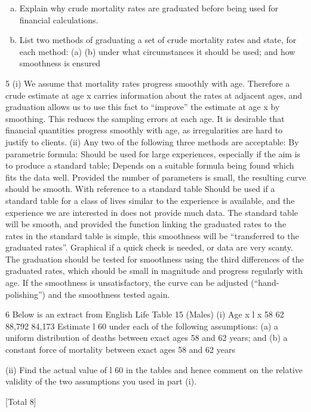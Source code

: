 \documentclass[a4paper,12pt]{article}
\begin{document}
\begin{enumerate}[(a)]
\item
Explain why crude mortality rates are graduated before being used for
financial calculations.
\item 
List two methods of graduating a set of crude mortality rates and state, for
each method:
(a)
(b)
under what circumstances it should be used; and
how smoothness is ensured
\end{enumerate}

\newpage

5
(i)
We assume that mortality rates progress smoothly with age.
Therefore a crude estimate at age x carries information about the rates at
adjacent ages, and graduation allows us to use this fact to “improve” the
estimate at age x by smoothing.
This reduces the sampling errors at each age.
It is desirable that financial quantities progress smoothly with age,
as irregularities are hard to justify to clients.
(ii)
Any two of the following three methods are acceptable:
By parametric formula:
Should be used for large experiences, especially if the aim is to produce a
standard table;
Depends on a suitable formula being found which fits the data well.
Provided the number of parameters is small, the resulting curve should be
smooth.
With reference to a standard table
Should be used if a standard table for a class of lives similar to the experience
is available, and the experience we are interested in does not provide much
data.
The standard table will be smooth,
and provided the function linking the graduated rates to the rates in the
standard table is simple, this smoothness will be “transferred to the graduated
rates”.
Graphical
if a quick check is needed, or data are very scanty.
The graduation should be tested for smoothness using the third differences of
the graduated rates, which should be small in magnitude and progress
regularly with age.
If the smoothness is unsatisfactory, the curve can be adjusted (“hand-
polishing”) and the smoothness tested again.
\newpage


6
Below is an extract from English Life Table 15 (Males)
(i)
Age x l x
58
62 88,792
84,173
Estimate l 60 under each of the following assumptions:
(a) a uniform distribution of deaths between exact ages 58 and 62 years;
and
(b) a constant force of mortality between exact ages 58 and 62 years

(ii)
Find the actual value of l 60 in the tables and hence comment on the relative validity of the two assumptions you used in part (i).

[Total 8]
\end{document}
